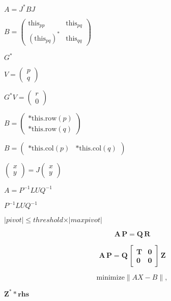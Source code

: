 \documentclass{article}
\begin{document}
$ A = J^* B J $
\pagebreak

$ B = \left ( \begin{array}{cc} \text{this}_{pp} & \text{this}_{pq} \\ (\text{this}_{pq})^* & \text{this}_{qq} \end{array} \right )$
\pagebreak

$ G^* $
\pagebreak

$ V = \left ( \begin{array}{c} p \\ q \end{array} \right )$
\pagebreak

$ G^* V = \left ( \begin{array}{c} r \\ 0 \end{array} \right )$
\pagebreak

$ B = \left ( \begin{array}{cc} \text{*this.row}(p) \\ \text{*this.row}(q) \end{array} \right ) $
\pagebreak

$ B = \left ( \begin{array}{cc} \text{*this.col}(p) & \text{*this.col}(q) \end{array} \right ) $
\pagebreak

$ \left ( \begin{array}{cc} x \\ y \end{array} \right ) = J \left ( \begin{array}{cc} x \\ y \end{array} \right ) $
\pagebreak

$ A = P^{-1} L U Q^{-1} $
\pagebreak

$ P^{-1} L U Q^{-1} $
\pagebreak

$ \vert pivot \vert \leqslant threshold \times \vert maxpivot \vert $
\pagebreak

\[ \mathbf{A} \, \mathbf{P} = \mathbf{Q} \, \mathbf{R} \]
\pagebreak

\[ \mathbf{A} \, \mathbf{P} = \mathbf{Q} \, \begin{bmatrix} \mathbf{T} & \mathbf{0} \\ \mathbf{0} & \mathbf{0} \end{bmatrix} \, \mathbf{Z} \]
\pagebreak

\[\mathrm{minimize} \|A X - B\|, \]
\pagebreak

$ \mathbf{Z}^* * \mathbf{rhs} $
\pagebreak
\end{document}
